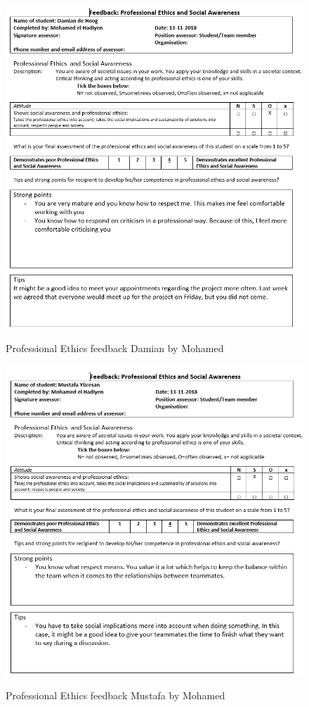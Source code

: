 \documentclass[12pt]{article}
\begin{document}
	\begin{figure}[p!]
		\centering
		\includegraphics[width=\columnwidth]{ProfEthDamian1.PNG}\\
		\caption{Professional Ethics feedback Damian by Mohamed}
	\end{figure}
	\begin{figure}[p!]
		\centering
		\includegraphics[width=\columnwidth]{ProfEthMustafa1.PNG}\\
		\caption{Professional Ethics feedback Mustafa by Mohamed}
	\end{figure}
\end{document}
